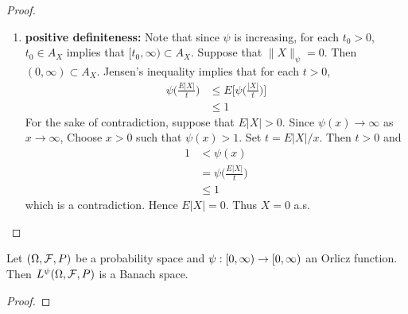 \documentclass{book}
\begin{document}
\begin{proof}
\begin{enumerate}
\begin{align*}
				& = 0 \\
				& \leq 1
			\end{align*}
			Thus
			\begin{align*}
				\|\lam X\|_{\psi} 
				& = 0 \\
				& = |\lam|\|X\|_{\psi}
			\end{align*}
			Suppose that $\lam \neq 0$. Since for each $t > 0$,
			$$\psi \bigg( \frac{|X|}{t} \bigg) = \psi \bigg( \frac{|\lam X|}{|\lam| t} \bigg)$$ 
			we have that for each $t > 0$, $t \in A_{X}$ iff $|\lam| t \in A_{\lam X}$. Therefore $A_{\lam X} = |\lam| A_{X}$ and 
			\begin{align*}
				\|\lam X\|_{\psi} 
				& = \inf A_{\lam X} \\
				& = |\lam| \inf A_X \\
				& = |\lam| \|X\|_{\psi} \\
			\end{align*}  
			So $|\lam X\| \in L^{\psi}(\Om, \MF, P)$.
 			\item \textbf{positive definiteness:} 
			Note that since $\psi$ is increasing, for each $t_0 >0$, $t_0 \in A_X$ implies that $[t_0, \infty) \subset A_X$. Suppose that $\|X\|_{\psi} = 0$. Then $(0, \infty) \subset A_X$. Jensen's inequality implies that for each $t > 0$,
			\begin{align*}
				\psi \bigg( \frac{E|X|}{t} \bigg) 
				& \leq E \bigg[\psi \bigg( \frac{|X|}{t} \bigg) \bigg] \\
				& \leq 1 
			\end{align*} 
			For the sake of contradiction, suppose that $E|X| > 0$. Since $\psi(x) \rightarrow \infty$ as $x \rightarrow \infty$, Choose $x > 0$ such that $\psi(x) > 1$. Set $t = E|X| /x$. Then $t > 0$ and 
			\begin{align*}
				1 
				& < \psi(x) \\
				& = \psi \bigg( \frac{E|X|}{t} \bigg) \\
				& \leq 1
			\end{align*}
			which is a contradiction. Hence $E|X| = 0$. Thus $X = 0$ a.s.  
		\end{enumerate}
	\end{proof}
	
	
	\begin{ex}
			Let $(\Omega, \mathcal{F}, P)$ be a probability space and $\psi: [0,\infty) \rightarrow [0,\infty)$ an Orlicz function. Then $L^{\psi}(\Omega, \mathcal{F}, P)$ is a Banach space.
	\end{ex}

	\begin{proof}
		
	\end{proof}
	
\end{document}
